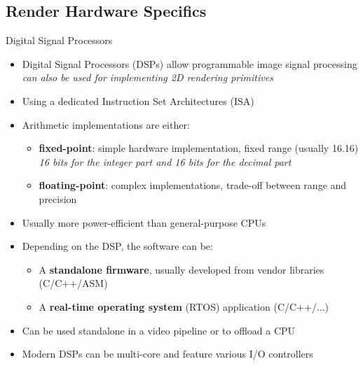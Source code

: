 \subsection{Render Hardware Specifics}

\begin{frame}{Digital Signal Processors}
  \begin{itemize}
  \item Digital Signal Processors (DSPs) allow programmable image signal processing\\
    \textit{can also be used for implementing 2D rendering primitives}
  \item Using a dedicated Instruction Set Architectures (ISA)
  \item Arithmetic implementations are either:
    \begin{itemize}
    \item \textbf{fixed-point}: simple hardware implementation, fixed range (usually 16.16)\\
      \textit{16 bits for the integer part and 16 bits for the decimal part}
    \item \textbf{floating-point}: complex implementations, trade-off between range and precision
    \end{itemize}
  \item Usually more power-efficient than general-purpose CPUs
  \item Depending on the DSP, the software can be:
    \begin{itemize}
    \item A \textbf{standalone firmware}, usually developed from vendor libraries (C/C++/ASM)
    \item A \textbf{real-time operating system} (RTOS) application (C/C++/...)
    \end{itemize}
  \item Can be used standalone in a video pipeline or to offload a CPU
  \item Modern DSPs can be multi-core and feature various I/O controllers
  \end{itemize}
\end{frame}

